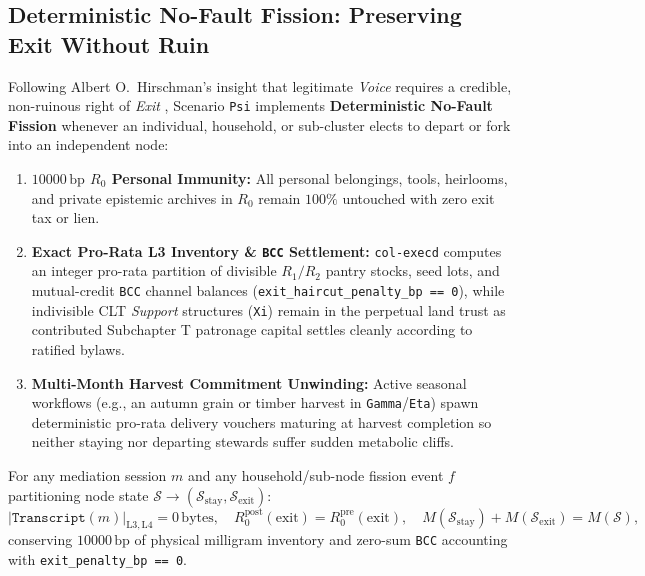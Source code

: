\subsection{Deterministic No-Fault Fission: Preserving Exit Without Ruin}

Following Albert O.~Hirschman's insight that legitimate \emph{Voice} requires a credible, non-ruinous right of \emph{Exit} \parencite{hirschman1970},
Scenario \texttt{Psi} implements \textbf{Deterministic No-Fault Fission} whenever an individual, household, or sub-cluster elects to depart or fork into
an independent node:
\begin{enumerate}
    \item \textbf{$10000\,\mathrm{bp}$ $R_0$ Personal Immunity:} All personal belongings, tools, heirlooms, and private epistemic archives in $R_0$
    remain $100\%$ untouched with zero exit tax or lien.
    \item \textbf{Exact Pro-Rata L3 Inventory \& \texttt{BCC} Settlement:} \texttt{col-execd} computes an integer pro-rata partition of divisible
    $R_1/R_2$ pantry stocks, seed lots, and mutual-credit \texttt{BCC} channel balances (\texttt{exit\_haircut\_penalty\_bp == 0}), while indivisible
    CLT \emph{Support} structures (\texttt{Xi}) remain in the perpetual land trust as contributed Subchapter T patronage capital settles cleanly
    according to ratified bylaws.
    \item \textbf{Multi-Month Harvest Commitment Unwinding:} Active seasonal workflows (e.g., an autumn grain or timber harvest in
    \texttt{Gamma}/\texttt{Eta}) spawn deterministic pro-rata delivery vouchers maturing at harvest completion so neither staying nor departing stewards
    suffer sudden metabolic cliffs.
\end{enumerate}

\begin{theorem}
\label{thm:psi-fission}
For any mediation session $m$ and any household/sub-node fission event $f$ partitioning node state
$\mathcal{S} \to (\mathcal{S}_{\mathrm{stay}}, \mathcal{S}_{\mathrm{exit}})$:
\begin{equation}
|\mathtt{Transcript}(m)|_{\mathrm{L3,L4}} = 0\,\mathrm{bytes}, \quad
R_0^{\mathrm{post}}(\text{exit}) = R_0^{\mathrm{pre}}(\text{exit}), \quad
M(\mathcal{S}_{\mathrm{stay}}) + M(\mathcal{S}_{\mathrm{exit}}) = M(\mathcal{S}),
\end{equation}
conserving $10000\,\mathrm{bp}$ of physical milligram inventory and zero-sum \texttt{BCC} accounting with \texttt{exit\_penalty\_bp == 0}.
\end{theorem}

